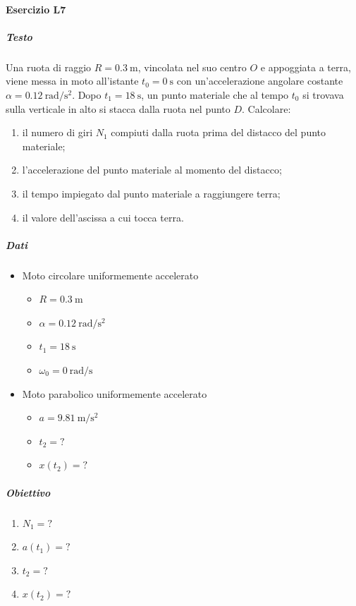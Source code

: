 \documentclass{article}
\begin{document}
\paragraph*{Esercizio L7}
\subparagraph*{Testo}
Una ruota di raggio \( R = \SI{0.3}{\meter} \), vincolata nel suo centro \( O \) e appoggiata a terra, viene messa in moto all'istante \( t_0 = \SI{0}{\second} \) con un'accelerazione angolare costante \( \alpha = \SI{0.12}{\radian\per\second\squared} \). Dopo \( t_1 = \SI{18}{\second} \), un punto materiale che al tempo \( t_0 \) si trovava sulla verticale in alto si stacca dalla ruota nel punto \( D \). Calcolare:
\begin{enumerate}[label=\alph*)]
    \item il numero di giri \( N_1 \) compiuti dalla ruota prima del distacco del punto materiale;
    \item l'accelerazione del punto materiale al momento del distacco;
    \item il tempo impiegato dal punto materiale a raggiungere terra;
    \item il valore dell'ascissa a cui tocca terra.
\end{enumerate}
\subparagraph*{Dati}
\begin{itemize}
    \item Moto circolare uniformemente accelerato
          \begin{itemize}
              \item $R = \SI{0.3}{\meter}$
              \item $\alpha = \SI{0.12}{\radian\per\second\squared}$
              \item $t_1 = \SI{18}{\second}$
              \item $\omega_0 = \SI{0}{\radian\per\second}$
          \end{itemize}
    \item Moto parabolico uniformemente accelerato
          \begin{itemize}
              \item $a = \SI{9.81}{\meter\per\second\squared}$
              \item $t_2 = ?$
              \item $x(t_2) = ?$
          \end{itemize}
\end{itemize}
\subparagraph*{Obiettivo}
\begin{enumerate}[label=\alph*)]
    \item $N_1 = ?$
    \item $a(t_1) = ?$
    \item $t_2 = ?$
    \item $x(t_2) = ?$
\end{enumerate}
\end{document}
